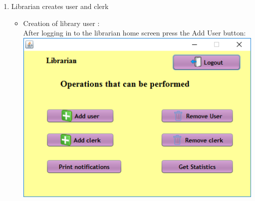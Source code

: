 \documentclass{article}
\begin{document}
\begin{enumerate}
\item Librarian creates user and clerk
\begin{itemize}
\item Creation of library user :\\
After logging in to the librarian home screen press the Add User button:\\
\includegraphics[scale=0.8]{images/LibrarianLogin/LibrarianHomeScreen.PNG}


\end{itemize}
\end{enumerate}
\end{document}
